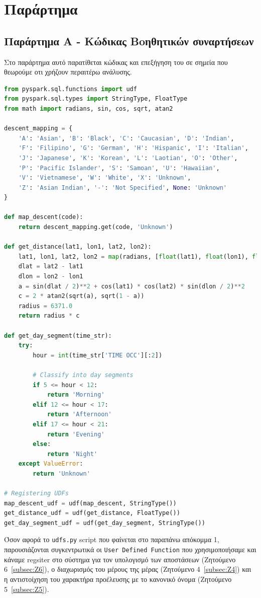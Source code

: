 \documentclass{article}
\begin{document}
\section*{Παράρτημα}
\label{sec:appendix}
\subsection*{Παράρτημα Α - Kώδικας Boηθητικών συναρτήσεων}
\label{subsec:apend_A}
Στο παράρτημα αυτό παρατίθεται κώδικας και επεξήγηση του σε σημεία που θεωρούμε οτι χρήζουν περαιτέρω ανάλυσης. 
\begin{lstlisting}[language=Python,caption={UDF registration script}]
from pyspark.sql.functions import udf
from pyspark.sql.types import StringType, FloatType
from math import radians, sin, cos, sqrt, atan2

descent_mapping = {
    'A': 'Asian', 'B': 'Black', 'C': 'Caucasian', 'D': 'Indian',
    'F': 'Filipino', 'G': 'German', 'H': 'Hispanic', 'I': 'Italian',
    'J': 'Japanese', 'K': 'Korean', 'L': 'Laotian', 'O': 'Other',
    'P': 'Pacific Islander', 'S': 'Samoan', 'U': 'Hawaiian',
    'V': 'Vietnamese', 'W': 'White', 'X': 'Unknown',
    'Z': 'Asian Indian', '-': 'Not Specified', None: 'Unknown'
}

def map_descent(code):
    return descent_mapping.get(code, 'Unknown')

def get_distance(lat1, lon1, lat2, lon2):
    lat1, lon1, lat2, lon2 = map(radians, [float(lat1), float(lon1), float(lat2), float(lon2)])
    dlat = lat2 - lat1
    dlon = lon2 - lon1
    a = sin(dlat / 2)**2 + cos(lat1) * cos(lat2) * sin(dlon / 2)**2
    c = 2 * atan2(sqrt(a), sqrt(1 - a))
    radius = 6371.0
    return radius * c

def get_day_segment(time_str):
    try:
        hour = int(time_str['TIME OCC'][:2])

        # Classify into day segments
        if 5 <= hour < 12:
            return 'Morning'
        elif 12 <= hour < 17:
            return 'Afternoon'
        elif 17 <= hour < 21:
            return 'Evening'
        else:
            return 'Night'
    except ValueError:
        return 'Unknown'

# Registering UDFs
map_descent_udf = udf(map_descent, StringType())
get_distance_udf = udf(get_distance, FloatType())
get_day_segment_udf = udf(get_day_segment, StringType())
\end{lstlisting}
Όσον αφορά το \texttt{udfs.py} script που φαίνεται στο παραπάνω απόκομμα 1, παρουσιάζονται συγκεντρωτικά οι \texttt{User Defined Function}  που χρησιμοποιήσαμε και κάναμε  regsiter  στο σύστημα για τον υπολογισμό των αποστάσεων (Ζητούμενο 6~\ref{subsec:Z6}), ο διαχωρισμός του μέρους της μέρας (Ζητούμενο 4~\ref{subsec:Z4}) και η αντιστοίχηση του χαρακτήρα προέλευσης με το κανονικό όνομα (Ζητούμενο 5~\ref{subsec:Z5}).
\end{document}

